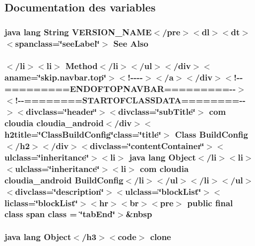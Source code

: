 \subsection{Documentation des variables}
\hypertarget{_build_config_8html_a3eebf44dd47803d1e279ee7fffdd6836}{
\subsubsection[{Also}]{\setlength{\rightskip}{0pt plus 5cm}java lang String V\-E\-R\-S\-I\-O\-N\-\_\-\-N\-A\-M\-E$<$/pre$>$$<$dl$>$$<${\bf dt}$>$$<$spanclass=\char`\"{}see\-Label\char`\"{}$>$ See Also}}\label{_build_config_8html_a3eebf44dd47803d1e279ee7fffdd6836}
\hypertarget{_build_config_8html_a74484d897627a44ab255f7ee74bf1370}{
\subsubsection[{class}]{\setlength{\rightskip}{0pt plus 5cm}$<$/li$>$$<$li$>$ Method$<$/li$>$$<$/ul$>$$<$/div$>$$<$aname=\char`\"{}skip.\-navbar.\-top\char`\"{}$>$$<$!-\/-\/-\/-\/$>$$<$/a$>$$<$/div$>$$<$!-\/-\/=========E\-N\-D\-O\-F\-T\-O\-P\-N\-A\-V\-B\-A\-R=========-\/-\/$>$$<$!-\/-\/========S\-T\-A\-R\-T\-O\-F\-C\-L\-A\-S\-S\-D\-A\-T\-A========-\/-\/$>$$<$divclass=\char`\"{}header\char`\"{}$>$$<$divclass=\char`\"{}sub\-Title\char`\"{}$>$ com cloudia cloudia\-\_\-android$<$/div$>$$<$h2title=\char`\"{}Class\-Build\-Config\char`\"{}class=\char`\"{}title\char`\"{}$>$ Class {\bf Build\-Config}$<$/h2$>$$<$/div$>$$<$divclass=\char`\"{}content\-Container\char`\"{}$>$$<$ulclass=\char`\"{}inheritance\char`\"{}$>$$<$li$>$ java lang Object$<$/li$>$$<$li$>$$<$ulclass=\char`\"{}inheritance\char`\"{}$>$$<$li$>$ com cloudia cloudia\-\_\-android {\bf Build\-Config}$<$/li$>$$<$/ul$>$$<$/li$>$$<$/ul$>$$<$divclass=\char`\"{}description\char`\"{}$>$$<$ulclass=\char`\"{}block\-List\char`\"{}$>$$<$liclass=\char`\"{}block\-List\char`\"{}$>$$<$hr$>$$<$br$>$$<$pre$>$ public final class {\bf span} class = \char`\"{}tab\-End\char`\"{}$>$\&nbsp}}\label{_build_config_8html_a74484d897627a44ab255f7ee74bf1370}
\hypertarget{_build_config_8html_adc9607fcabf6f2d7f401ad52015ef6e0}{
\subsubsection[{clone}]{\setlength{\rightskip}{0pt plus 5cm}java lang Object$<$/h3$>$$<$code$>$ clone}}\label{_build_config_8html_adc9607fcabf6f2d7f401ad52015ef6e0}
